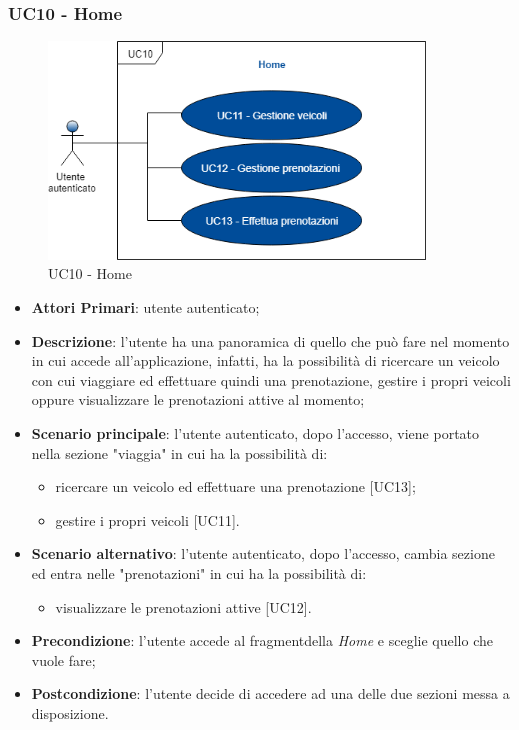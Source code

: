  \subsubsection{UC10 - Home}
  \begin{figure}[H]
 	\includegraphics[width=10cm]{res/images/UC10-Home.png}
 	\centering
 	\caption{UC10 - Home}
 \end{figure}
 \begin{itemize}
 	\item \textbf{Attori Primari}: utente autenticato;
 	\item \textbf{Descrizione}: l'utente ha una panoramica di quello che può fare nel momento in cui accede all'applicazione, infatti, ha la possibilità di ricercare un veicolo con cui viaggiare ed effettuare quindi una prenotazione, gestire i propri veicoli oppure visualizzare le prenotazioni attive al momento;
 	\item \textbf{Scenario principale}: l'utente autenticato, dopo l'accesso, viene portato nella sezione "viaggia" in cui ha la possibilità di:
 	\begin{itemize}
 		\item ricercare un veicolo ed effettuare una prenotazione [UC13];
 		\item gestire i propri veicoli [UC11].
 	\end{itemize}
 	\item \textbf{Scenario alternativo}: l'utente autenticato, dopo l'accesso, cambia sezione ed entra nelle "prenotazioni" in cui ha la possibilità di:
	 	\begin{itemize}
	 		\item visualizzare le prenotazioni attive [UC12]. 
	 	\end{itemize}
 	\item \textbf{Precondizione}: l'utente accede al fragment\glosp della \textit{Home} e sceglie quello che vuole fare;
 	\item \textbf{Postcondizione}: l'utente decide di accedere ad una delle due sezioni messa a disposizione.
 \end{itemize}